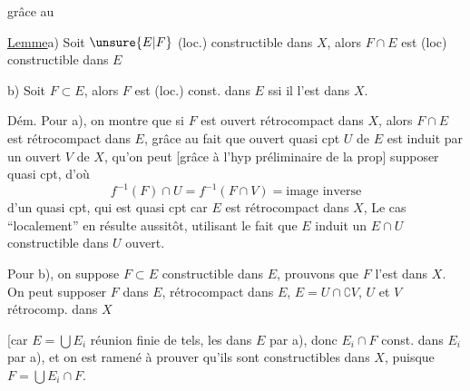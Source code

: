 grâce au

\uline{Lemme}\quad a) Soit $\unsure{E|F}$ (loc.) constructible dans $X$,  alors $F\cap E$ est (loc) constructible dans $E$

b) Soit $F\subset E$,  alors $F$ est (loc.) const. dans $E$ ssi il l'est dans $X$.


Dém. Pour a), on montre que si $F$ est ouvert rétrocompact dans $X$, alors $F\cap E$ est rétrocompact dans $E$, grâce au fait que \unsure{$\forall$} ouvert quasi cpt $U$ de $E$ est induit par un ouvert $V$ de $X$, qu'on peut  [grâce à l'hyp préliminaire de la prop] supposer quasi cpt, d'où
\[
f^{-1}(F)\cap U=f^{-1}(F\cap V)=\text{image inverse}
\]
d'un quasi cpt, qui est quasi cpt car $E$ est rétrocompact dans $X$,   Le cas ``localement'' en résulte aussitôt, utilisant le fait que $E$ induit un $E\cap U$ constructible dans  $U$ ouvert.


Pour b), on suppose $F\subset E$ constructible dans \uline{$E$},  prouvons que $F$ l'est dans $X$. On peut supposer $F$  dans $E$, rétrocompact dans $E$,  $E=U\cap\complement V$, $U$ et $V$ rétrocomp. dans $X$ 

[car $E=\bigcup E_i$ réunion finie de tels, les  dans \uline{$E$} par a), donc $E_i\cap F$ const. dans $E_i$ par a), et on est ramené à prouver qu'ils sont constructibles dans $X$, puisque $F=\bigcup E_i\cap F$.



